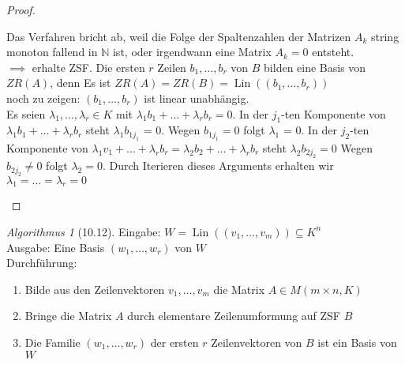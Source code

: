 \documentclass[a4paper]{scrartcl}
\DeclareMathOperator{\Lin}{Lin}
\theoremstyle{definition}
\theoremstyle{plain}
\theoremstyle{plain}
\theoremstyle{remark}
\theoremstyle{remark}
\theoremstyle{remark}
\theoremstyle{remark}
\newtheorem{algorithm}{Algorithmus}
\theoremstyle{remark}
\begin{document}
\begin{proof}
\begin{enumerate}
\begin{enumerate}
Das Verfahren bricht ab, weil die Folge der Spaltenzahlen der Matrizen $A_k$ string monoton fallend in $\mathbb{N}$ ist, oder irgendwann eine Matrix $A_k = 0$ entsteht. \\
        $\implies$ erhalte ZSF.
Die ersten $r$ Zeilen $b_1, \ldots, b_r$ von $B$ bilden eine Basis von $ZR(A)$, denn Es ist $ZR(A) = ZR(B) = \Lin((b_1, \ldots, b_r))$ \\
        noch zu zeigen: $(b_1, \ldots, b_r)$ ist linear unabhängig. \\
        Es seien $\lambda_1, \dots, \lambda_r \in K$ mit $\lambda_1 b_1 + \ldots + \lambda_r b_r = 0$. In der $j_1$-ten Komponente von $\lambda_1 b_1 + \ldots + \lambda_r b_r$ steht $\lambda_1 b_{1 j_1}$ = 0.
Wegen $b_{1 j_1} = 0$ folgt $\lambda_1$ = 0.
In der $j_2$-ten Komponente von $\lambda_1 v_1 + \ldots + \lambda_r b_r = \lambda_2 b_2 + \ldots + \lambda_r b_r$ steht $\lambda_2 b_{2 j_2} = 0$
Wegen $b_{2 j_2} \neq 0$ folgt $\lambda_2 = 0$.
Durch Iterieren dieses Arguments erhalten wir $\lambda_1 = \ldots = \lambda_r = 0$
\end{enumerate}
\end{enumerate}
\end{proof}
\begin{algorithm}[10.12]
Eingabe: $W = \Lin((v_1, \ldots, v_m)) \subseteq K^n$ \\
  Ausgabe: Eine Basis $(w_1, \ldots, w_r)$ von $W$ \\
  Durchführung: \\
\begin{enumerate}
\item Bilde aus den Zeilenvektoren $v_1, \ldots, v_m$ die Matrix $A\in M(m\times n, K)$
\item Bringe die Matrix $A$ durch elementare Zeilenumformung auf ZSF $B$
\item Die Familie $(w_1, \ldots, w_r)$ der ersten $r$ Zeilenvektoren von $B$ ist ein Basis von $W$
\end{enumerate}
\end{algorithm}
\end{document}
